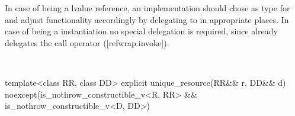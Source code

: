 \documentclass[ebook,11pt,article]{memoir}
\begin{document}
\pnum
\begin{note} In case of  being a lvalue reference, an implementation should chose  as type for  and adjust functionality accordingly by delegating to  in appropriate places. In case of  being a  instantiation no special delegation is required, since  already delegates the call operator ([refwrap.invoke]).
\end{note} %

\pnum
\requires
{}\\



\begin{itemdecl}
    template<class RR, class DD>
    explicit unique_resource(RR&& r, DD&& d)
        noexcept(is_nothrow_constructible_v<R, RR> 
                && is_nothrow_constructible_v<D, DD>)
\end{itemdecl}
\end{document}
